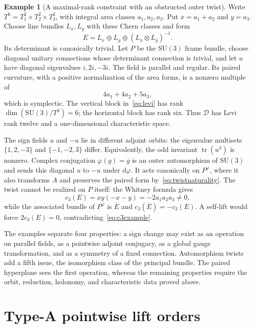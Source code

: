\documentclass[11pt]{amsart}
\newcommand{\dd}{\mathrm d}
\theoremstyle{plain}
\theoremstyle{definition}
\newtheorem{example}[theorem]{Example}
\theoremstyle{remark}
\begin{document}
\begin{example}[A maximal-rank constraint with an obstructed outer twist]\label{ex:SU3}
Write $T^6=T^2_1\times T^2_2\times T^2_3$, with integral area classes $a_1,a_2,a_3$.  Put $x=a_1+a_2$ and $y=a_3$.  Choose line bundles $L_x,L_y$ with these Chern classes and form
\[
 E=L_x\oplus L_y\oplus(L_x\otimes L_y)^{-1}.
\]
Its determinant is canonically trivial.  Let $P$ be the $\mathrm{SU}(3)$ frame bundle, choose diagonal unitary connections whose determinant connection is trivial, and let $u$ have diagonal eigenvalues $i,2i,-3i$.  The field is parallel and regular.  Its paired curvature, with a positive normalization of the area forms, is a nonzero multiple of
\[
 4a_1+4a_2+5a_3,
\]
which is symplectic.  The vertical block in~\eqref{eq:levi} has rank $\dim(\mathrm{SU}(3)/T^2)=6$; the horizontal block has rank six.  Thus $\mathcal D$ has Levi rank twelve and a one-dimensional characteristic space.

The sign fields $u$ and $-u$ lie in different adjoint orbits: the eigenvalue multisets $\{1,2,-3\}$ and $\{-1,-2,3\}$ differ.  Equivalently, the odd invariant $\operatorname{tr}(u^3)$ is nonzero.  Complex conjugation $\varphi(g)=\overline g$ is an outer automorphism of $\mathrm{SU}(3)$ and sends this diagonal $u$ to $-u$ under $\dd\varphi$.  It acts canonically on $P^\varphi$, where it also transforms $A$ and preserves the paired form by~\eqref{eq:twistnaturality}.  The twist cannot be realized on $P$ itself: the Whitney formula gives
\begin{equation}\label{eq:c3example}
 c_3(E)=xy(-x-y)=-2a_1a_2a_3\ne0,
\end{equation}
while the associated bundle of $P^\varphi$ is $\overline E$ and $c_3(\overline E)=-c_3(E)$.  A self-lift would force $2c_3(E)=0$, contradicting~\eqref{eq:c3example}.
\end{example}

The examples separate four properties: a sign change may exist as an operation on parallel fields, as a pointwise adjoint conjugacy, as a global gauge transformation, and as a symmetry of a fixed connection.  Automorphism twists add a fifth issue, the isomorphism class of the principal bundle.  The paired hyperplane sees the first operation, whereas the remaining properties require the orbit, reduction, holonomy, and characteristic data proved above.

\section{Type-A pointwise lift orders}
\end{document}
